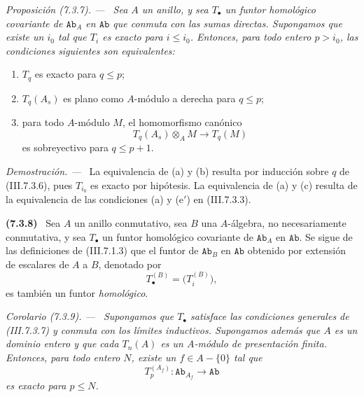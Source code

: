 \documentclass[10pt,oneside]{book}
\newcommand{\cat}[1]{\mathtt{#1}}
\newcommand{\sref}[2][]{\textup{(#2)}}
\newcommand{\oldpage}[2][]{\setcounter{footnote}{0}\marginpar{\scriptsize\textbf{#1}~|~#2}\ignorespaces}
\newenvironment{env}[1][]{\par\medskip\noindent\textbf{(#1)}\ }{\par}
\newenvironment{proposition}[1][]{\par\medskip\noindent\itshape Proposición (#1). ---\ }{\par}
\newenvironment{corollary}[1][]{\par\medskip\noindent\itshape Corolario (#1). ---\ }{\par}
\newenvironment{proof}{\par\medskip\noindent\textit{Demostración. ---\ }}{\par}
\providecommand{\setmin}{-}%
\begin{document}
\begin{proposition}[7.3.7]
\label{III.7.3.7}
Sea $A$ un anillo, y sea $T_\bullet$ un funtor homológico
covariante de $\cat{Ab}_A$ en $\cat{Ab}$ que conmuta con las
sumas directas. Supongamos que existe un $i_0$ tal que $T_i$ es
exacto para $i\leq i_0$. Entonces, para todo entero $p>i_0$, las
condiciones siguientes son equivalentes:
\begin{enumerate}
  \item[(a)] $T_q$ es exacto para $q\leq p$;
  \item[(b)] $T_q(A_s)$ es plano como $A$-módulo a derecha para
    $q\leq p$;
  \item[(c)] para todo $A$-módulo $M$, el homomorfismo canónico
    \[
      T_q(A_s)\otimes_A M
      \longrightarrow
      T_q(M)
    \]
    es sobreyectivo para $q\leq p+1$.
\end{enumerate}
\end{proposition}

\begin{proof}
La equivalencia de (a) y (b) resulta por inducción sobre $q$ de
\sref{III.7.3.6}, pues $T_{i_0}$ es exacto por hipótesis. La
equivalencia de (a) y (c) resulta de la equivalencia de las
condiciones (a) y ($\mathrm{e}'$) en \sref{III.7.3.3}.
\end{proof}

\oldpage[III]{184}

\begin{env}[7.3.8]
\label{III.7.3.8}
Sea $A$ un anillo conmutativo, sea $B$ una $A$-álgebra, no
necesariamente conmutativa, y sea $T_\bullet$ un funtor homológico
covariante de $\cat{Ab}_A$ en $\cat{Ab}$. Se sigue de las
definiciones de \sref{III.7.1.3} que el funtor de $\cat{Ab}_B$ en
$\cat{Ab}$ obtenido por extensión de escalares de $A$ a $B$,
denotado por
\[
  T_\bullet^{(B)}=\bigl(T_i^{(B)}\bigr),
\]
es también un funtor \emph{homológico}.
\end{env}

\begin{corollary}[7.3.9]
\label{III.7.3.9}
Supongamos que $T_\bullet$ satisface las condiciones generales de
\sref{III.7.3.7} y conmuta con los límites inductivos. Supongamos
además que $A$ es un dominio entero y que cada $T_n(A)$ es un
$A$-módulo de presentación finita. Entonces, para todo entero $N$,
existe un $f\in A\setmin\{0\}$ tal que
\[
  T_p^{(A_f)}:\cat{Ab}_{A_f}\longrightarrow\cat{Ab}
\]
es exacto para $p\leq N$.
\end{corollary}
\end{document}
